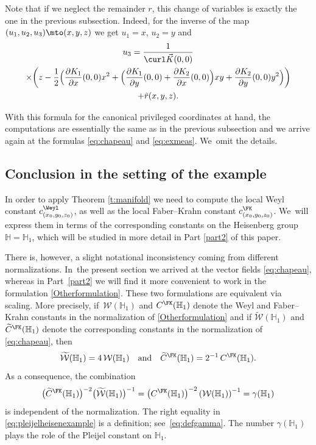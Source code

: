Note that if we neglect the remainder $r$, this change of variables is exactly the one in the previous subsection. Indeed, for the inverse of the map $(u_1,u_2,u_3)\mto (x,y,z)$ we get $u_1=x$, $u_2=y$ and
\begin{multline*}
u_3 = \frac{1}{\curl \vec K (0,0)}\\
\times\biggl(z - \frac12 \Bigl(\frac{\partial K_1}{\partial x}(0,0) x^2+ \Bigl(\frac{\partial K_1}{\partial y}(0,0) + \frac{\partial K_2}{\partial x}(0,0) \Bigr) xy
+ \frac{\partial K_2}{\partial y}(0,0) y^2\Bigr) \biggr) \\
+ \tilde r(x,y,z).
\end{multline*}

With this formula for the canonical privileged coordinates at hand, the computations are essentially the same as in the previous subsection and we arrive again at the formulas \eqref{eq:chapeau} and \eqref{eq:exmeas}. We~omit the details.

\subsection{Conclusion in the setting of the example}\label{sec:exampleconclusion}
In order to apply Theorem \ref{t:manifold} we need to compute the local Weyl constant $c^\Weyl_{(x_0,y_0,z_0)}$, as well as the local Faber--Krahn constant $c_{(x_0,y_0,z_0)}^\FK$. We~will express them in terms of the corresponding constants on the Heisenberg group $\mathbb H = \mathbb H_1$, which will be studied in more detail in Part \ref{part2} of this paper.

There is, however, a slight notational inconsistency coming from different normalizations. In~the present section we arrived at the vector fields \eqref{eq:chapeau}, whereas in Part~\ref{part2} we will find it more convenient to work in the formulation \eqref{Otherformulation}. These two formulations are equivalent via scaling. More precisely, if~$\mathcal W(\mathbb H_1)$ and $C^\FK(\mathbb H_1)$ denote the Weyl and Faber--Krahn constants in the normalization of \eqref{Otherformulation} and if
$\widetilde{\mathcal W}(\mathbb H_1)$ and $\widetilde C^\FK(\mathbb H_1)$ denote the corresponding constants in the normalization of \eqref{eq:chapeau}, then
\[
\widetilde{\mathcal W}(\mathbb H_1) = 4\,\mathcal W(\mathbb H_1)
\quad\text{and}\quad
\widetilde C^\FK(\mathbb H_1) = 2^{-1}\,C^\FK(\mathbb H_1).
\]
As a consequence, the combination
\begin{equation}
\label{eq:pleijelheisenexample}
\bigl(\widetilde C^\FK(\mathbb H_1)\bigr)^{-2} \bigl(\widetilde{\mathcal W}(\mathbb H_1)\bigr)^{-1} = \left(C^\FK(\mathbb H_1)\right)^{-2} \left(\mathcal W(\mathbb H_1)\right)^{-1} = \gamma(\mathbb H_1)
\end{equation}
is independent of the normalization. The right equality in \eqref{eq:pleijelheisenexample} is a definition; see~\eqref{eq:defgamma}. The number $\gamma(\mathbb H_1)$ plays the role of the Pleijel constant on $\mathbb H_1$.

